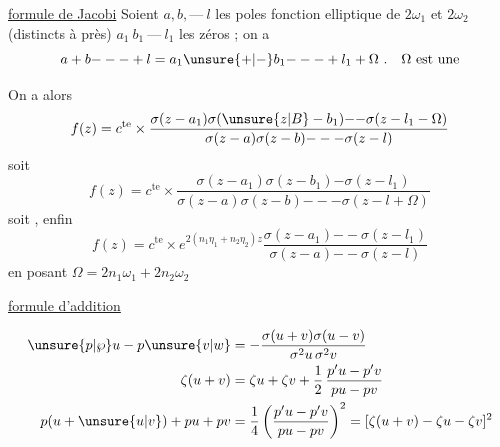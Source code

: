 \uline{formule de Jacobi} Soient $a,b,\mathord{\text{---}}\ l$ les poles   fonction elliptique de  $2\omega_1$ et $2\omega_2$ (distincts à \unsure{$2\omega$|$1\omega$} près) $a_1\ b_1\ \mathord{\text{---}}\ l_1$ les zéros ; on a
\[
a+b\mathord{---}+l=a_1\unsure{+|-}b_1\mathord{---}+l_1+\Omega\ .\quad \Omega\ \text{est une}
\]

On a alors
\[
f(z)=c^{\mathrm{te}}\times\frac{\sigma(z-a_1)\sigma(\unsure{z|B}-b_1)\mathord{--}\sigma(z-l_1-\Omega)}
{\sigma(z-a)\sigma(z-b)\mathord{---}\sigma(z-l)}
\]
soit
\[
f(z)=c^{\mathrm{te}}\times\frac{\sigma(z-a_1)\sigma(z-b_1)\mathord{-}\sigma(z-l_1)}
{\sigma(z-a)\sigma(z-b)\mathord{---}\sigma(z-l+\Omega)}
\]
soit , enfin
\[
f(z)=c^{\mathrm{te}}\times e^{2(n_1\eta_1+n_2\eta_2)z}
\frac{\sigma(z-a_1)\mathord{--}\sigma(z-l_1)}{\sigma(z-a)\mathord{--}\sigma(z-l)}
\]
en posant $\Omega=2n_1\omega_1+2n_2\omega_2$

\uline{formule d'addition}

\[
\begin{aligned}
\unsure{p|\wp}u-p\unsure{v|w}&=-\frac{\sigma(u+v)\sigma(u-v)}{\sigma^2u\,\sigma^2v}\\
\zeta(u+v)&=\zeta u+\zeta v+\frac12\,\frac{p'u-p'v}{pu-pv}\\
p(u+\unsure{u|v})+pu+pv&=\frac14\left(\frac{p'u-p'v}{pu-pv}\right)^2=[\zeta(u+v)-\zeta u-\zeta v]^2
\end{aligned}
\]
